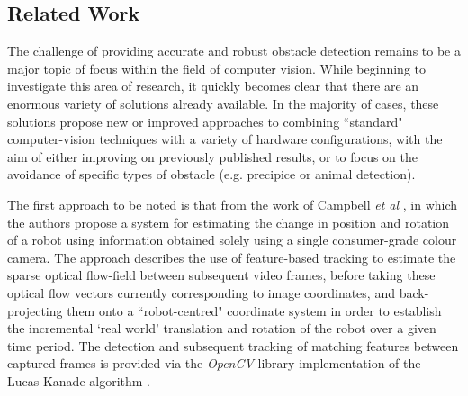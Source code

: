 \subsection{Related Work}
\label{related-work}

The challenge of providing accurate and robust obstacle detection remains to be a major topic of focus within the field of computer vision. While beginning to investigate this area of research, it quickly becomes clear that there are an enormous variety of solutions already available. In the majority of cases, these solutions propose new or improved approaches to combining ``standard" computer-vision techniques with a variety of hardware configurations, with the aim of either improving on previously published results, or to focus on the avoidance of specific types of obstacle (e.g. precipice or animal detection). 



The first approach to be noted is that from the work of Campbell \textit{et al} \cite{campbell}, in which the authors propose a system for estimating the change in position and rotation of a robot using information obtained solely using a single consumer-grade colour camera. The approach describes the use of feature-based tracking to estimate the sparse optical flow-field between subsequent video frames, before taking these optical flow vectors currently corresponding to image coordinates, and back-projecting them onto a ``robot-centred" coordinate system in order to establish the incremental `real world' translation and rotation of the robot over a given time period. The detection and subsequent tracking of matching features between captured frames is provided via the \textit{OpenCV} library implementation of the Lucas-Kanade algorithm \cite{shi1994good}. 

